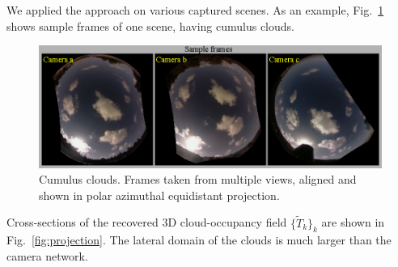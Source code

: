 \documentclass[runningheads]{llncs}
\begin{document}
We applied the approach on various captured scenes. As an example, Fig.~\ref{fig:cu} shows sample frames of one scene, having cumulus clouds.
\begin{figure}[t!]
\begin{center}
   \includegraphics[width=1\linewidth]{figures/projection.eps}
\end{center}
   \vspace{-0.6cm}
   \caption{Cumulus clouds. Frames taken from multiple views, aligned and  shown in polar azimuthal equidistant projection.
   }
\label{fig:cu}
\end{figure}
Cross-sections of the recovered 3D cloud-occupancy field $\{\tilde T_k\}_k$ are shown in Fig.~\ref{fig:projection}. The lateral domain of the clouds is much larger than the camera network. 
\end{document}
